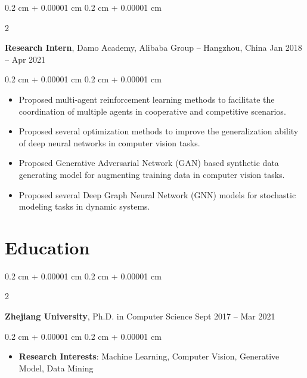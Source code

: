 \documentclass[10pt, letterpaper]{article}
\newenvironment{highlights}{
    \begin{itemize}[
        topsep=0.10 cm,
        parsep=0.10 cm,
        partopsep=0pt,
        itemsep=0pt,
        leftmargin=0.4 cm + 10pt
    ]
}{
    \end{itemize}
} %
\newenvironment{onecolentry}{
    \begin{adjustwidth}{
        0.2 cm + 0.00001 cm
    }{
        0.2 cm + 0.00001 cm
    }
}{
    \end{adjustwidth}
} %
\newenvironment{twocolentry}[2][]{
    \onecolentry
    \def\secondColumn{#2}
    \setcolumnwidth{\fill, 4.5 cm}
    \begin{paracol}{2}
}{
    \switchcolumn \raggedleft \secondColumn
    \end{paracol}
    \endonecolentry
} %
\begin{document}
        \vspace{0.2 cm}

        \begin{twocolentry}{
            Jan 2018 – Apr 2021
        }
            \textbf{Research Intern}, Damo Academy, Alibaba Group -- Hangzhou, China\end{twocolentry}

        \vspace{0.10 cm}
        \begin{onecolentry}
            \begin{highlights}
                \item Proposed multi-agent reinforcement learning methods to facilitate the coordination of multiple agents in cooperative and competitive scenarios.
                \item Proposed several optimization methods to improve the generalization ability of deep neural networks in computer vision tasks.
                \item Proposed Generative Adversarial Network (GAN) based synthetic data generating model for augmenting training data in computer vision tasks.
                \item Proposed several Deep Graph Neural Network (GNN) models for stochastic modeling tasks in dynamic systems.
            \end{highlights}
        \end{onecolentry}



    
    \section{Education}



        
        \begin{twocolentry}{
            Sept 2017 – Mar 2021
        }
            \textbf{Zhejiang University}, Ph.D. in Computer Science\end{twocolentry}

        \vspace{0.10 cm}
        \begin{onecolentry}
            \begin{highlights}
                \item \textbf{Research Interests}: Machine Learning, Computer Vision, Generative Model, Data Mining
            \end{highlights}
        \end{onecolentry}
\end{document}
